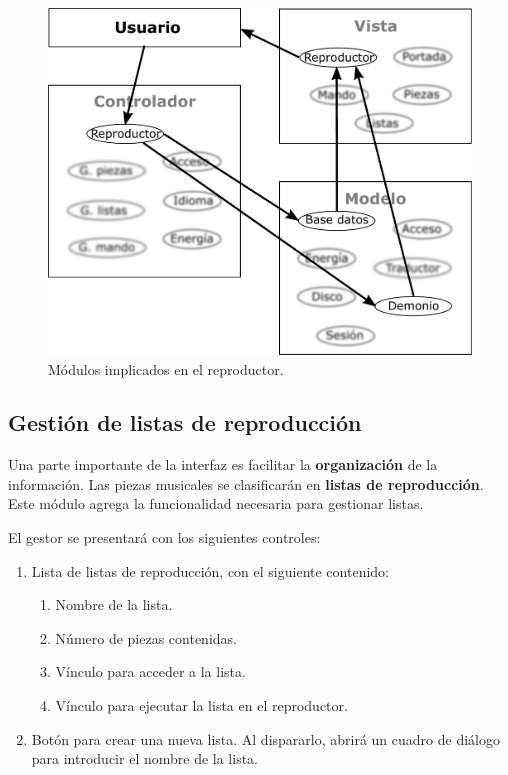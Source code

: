 \begin{figure}[H]
	\noindent \begin{centering}
		\includegraphics[width=\linewidth/2]{capitulo4/mvc_reproductor}
		\par\end{centering}
	\smallskip
	\caption{\label{fig:mvc_reproductor} Módulos implicados en el reproductor.}
\end{figure} 

\smallskip

\subsection{Gestión de listas de reproducción}
\label{subsec:listas}

Una parte importante de la interfaz es facilitar la \textbf{organización} de la información. Las piezas musicales se clasificarán en \textbf{listas de reproducción}. Este módulo agrega la funcionalidad necesaria para gestionar listas.

El gestor se presentará con los siguientes controles:

\begin{enumerate}
	\item Lista de listas de reproducción, con el siguiente contenido:

	\begin{enumerate}
		\item Nombre de la lista.
		\item Número de piezas contenidas.
		\item Vínculo para acceder a la lista.
		\item Vínculo para ejecutar la lista en el reproductor.
	\end{enumerate}
	
	\item Botón para crear una nueva lista. Al dispararlo, abrirá un cuadro de diálogo para introducir el nombre de la lista.
	
\end{enumerate}

